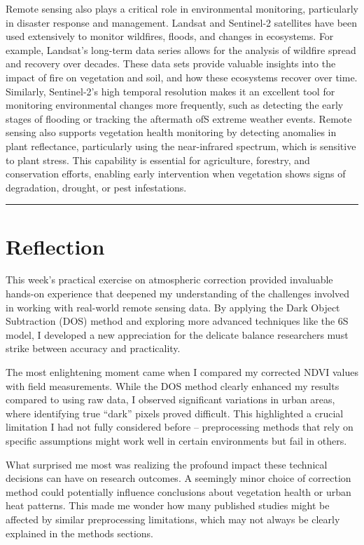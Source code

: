 \documentclass[
  letterpaper,
  DIV=11,
  numbers=noendperiod]{scrreprt}
\begin{document}
Remote sensing also plays a critical role in environmental monitoring,
particularly in disaster response and management. Landsat and Sentinel-2
satellites have been used extensively to monitor wildfires, floods, and
changes in ecosystems. For example, Landsat's long-term data series
allows for the analysis of wildfire spread and recovery over decades.
These data sets provide valuable insights into the impact of fire on
vegetation and soil, and how these ecosystems recover over time.
Similarly, Sentinel-2's high temporal resolution makes it an excellent
tool for monitoring environmental changes more frequently, such as
detecting the early stages of flooding or tracking the aftermath ofS
extreme weather events. Remote sensing also supports vegetation health
monitoring by detecting anomalies in plant reflectance, particularly
using the near-infrared spectrum, which is sensitive to plant stress.
This capability is essential for agriculture, forestry, and conservation
efforts, enabling early intervention when vegetation shows signs of
degradation, drought, or pest infestations.

\begin{center}\rule{0.5\linewidth}{0.5pt}\end{center}

\section{Reflection}\label{reflection-1}

This week's practical exercise on atmospheric correction provided
invaluable hands-on experience that deepened my understanding of the
challenges involved in working with real-world remote sensing data. By
applying the Dark Object Subtraction (DOS) method and exploring more
advanced techniques like the 6S model, I developed a new appreciation
for the delicate balance researchers must strike between accuracy and
practicality.

The most enlightening moment came when I compared my corrected NDVI
values with field measurements. While the DOS method clearly enhanced my
results compared to using raw data, I observed significant variations in
urban areas, where identifying true ``dark'' pixels proved difficult.
This highlighted a crucial limitation I had not fully considered before
-- preprocessing methods that rely on specific assumptions might work
well in certain environments but fail in others.

What surprised me most was realizing the profound impact these technical
decisions can have on research outcomes. A seemingly minor choice of
correction method could potentially influence conclusions about
vegetation health or urban heat patterns. This made me wonder how many
published studies might be affected by similar preprocessing
limitations, which may not always be clearly explained in the methods
sections.
\end{document}
